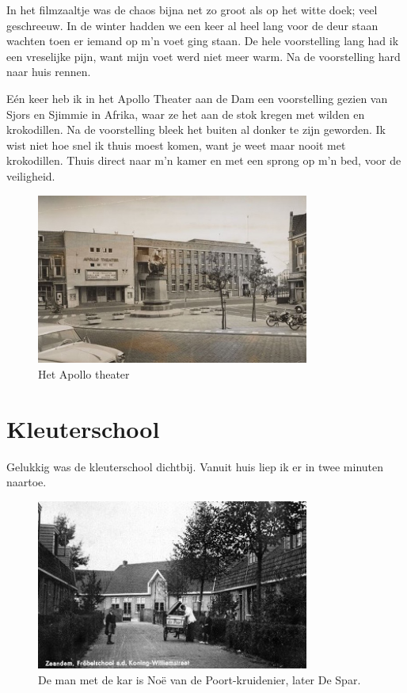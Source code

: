 \documentclass[12pt,twoside, openright]{memoir}
\begin{document}
In het filmzaaltje was de chaos bijna net zo groot als op het witte doek; veel geschreeuw. In de winter hadden we een keer al heel lang voor de deur staan wachten toen er iemand op m’n voet ging staan. De hele voorstelling lang had ik een vreselijke pijn, want mijn voet werd niet meer warm. Na de voorstelling hard naar huis rennen.

Eén keer heb ik in het Apollo Theater aan de Dam een voorstelling gezien van Sjors en Sjimmie in Afrika, waar ze het aan de stok kregen met wilden en krokodillen. Na de voorstelling bleek het buiten al donker te zijn geworden. Ik wist niet hoe snel ik thuis moest komen, want je weet maar nooit met krokodillen. Thuis direct naar m’n kamer en met een sprong op m’n bed, voor de veiligheid. 

\begin{figure}
\centering
\includegraphics[width=0.8\textwidth]{img/ch5/apollo}
\caption*{\footnotesize Het Apollo theater}
\end{figure}

\section*{Kleuterschool} %
\label{cha:kleuterschool}

Gelukkig was de kleuterschool dichtbij. Vanuit huis liep ik er in twee minuten naartoe.

\begin{figure}
\centering
\includegraphics[width=0.8\textwidth]{img/ch6/Frobelschool}
\caption*{\footnotesize De man met de kar is Noë van de Poort-kruidenier, later De Spar.}
\end{figure}
\end{document}
